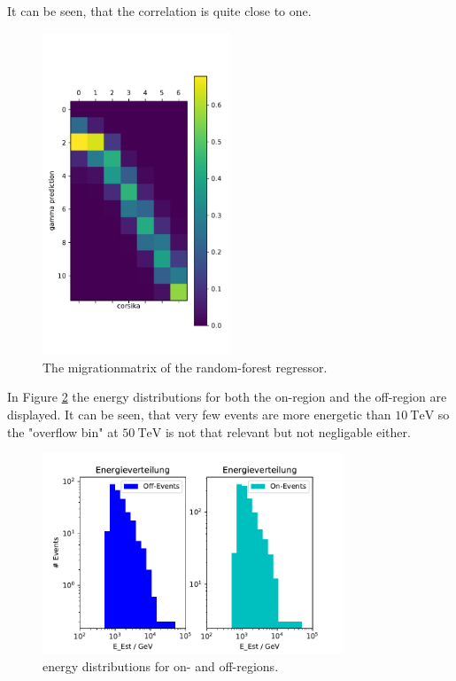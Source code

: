 It can be seen, that the correlation is quite close to one.
\begin{figure}[H]
  \centering
  \includegraphics[width=0.5\textwidth]{plots/Matrix.pdf}
  \caption{The migrationmatrix of the random-forest regressor.}
  \label{fig:matrix}
\end{figure}

In Figure \ref{fig:Edist} the energy distributions for both the on-region and the off-region are displayed. 
It can be seen, that very few events are more energetic than $\SI{10}{\tera\electronvolt}$ so the 
"overflow bin" at $\SI{50}{\tera\electronvolt}$ is not that relevant but not negligable either.

\begin{figure}[H]
  \centering
  \includegraphics[width=0.8\textwidth]{plots/E_verteilung.pdf}
  \caption{energy distributions for on- and off-regions.}
  \label{fig:Edist}
\end{figure}

